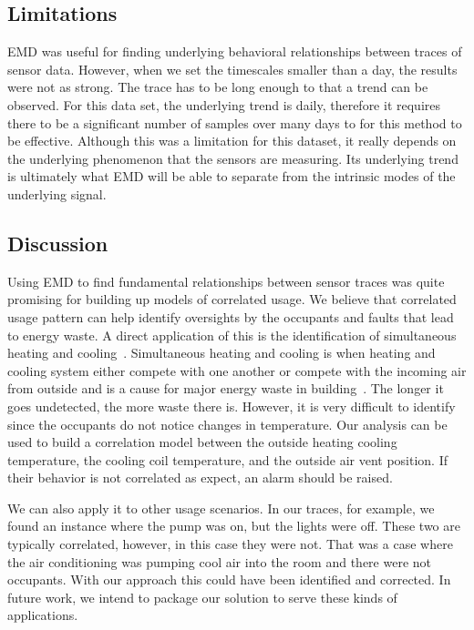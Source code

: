 \subsection{Limitations}
EMD was useful for finding underlying behavioral relationships between traces of sensor data.  However,
when we set the timescales smaller than a day, the results were not as strong.
The trace has to be long enough to that a trend can be observed.  For this data set, the underlying
trend is daily, therefore it requires there to be a significant number of samples over many days to
for this method to be effective.
Although this was a limitation for this dataset, it really depends on the underlying phenomenon that
the sensors are measuring.  Its underlying trend is ultimately what EMD will be able to separate
from the intrinsic modes of the underlying signal.

\subsection{Discussion}
Using EMD to find fundamental relationships between sensor traces was quite promising for building
up models of correlated usage.  We believe that correlated usage pattern can help identify oversights
by the occupants and faults that lead to energy waste.  A direct application of this is the identification
of simultaneous heating and cooling~\cite{simheatcool}.  Simultaneous heating and cooling is when heating
and cooling system either compete with one another or compete with the incoming air from outside and is
a cause for major energy waste in building~\cite{simheatcool}.  The longer it goes undetected,
the more waste there is.  However, it is very difficult to identify since the occupants do not notice
changes in temperature.  Our analysis can be used to build a correlation model between the outside
heating cooling temperature, the cooling coil temperature, and the outside air vent position.  If their behavior
is not correlated as expect, an alarm should be raised.

We can also apply it to other usage scenarios.  In our traces, for example, we found an instance where the pump
was on, but the lights were off.  These two are typically correlated, however, in this case they were not.
That was a case where the air conditioning was pumping cool air into the room and there were not occupants.
With our approach this could have been identified and corrected.  In future work, we intend to
package our solution to serve these kinds of applications.

